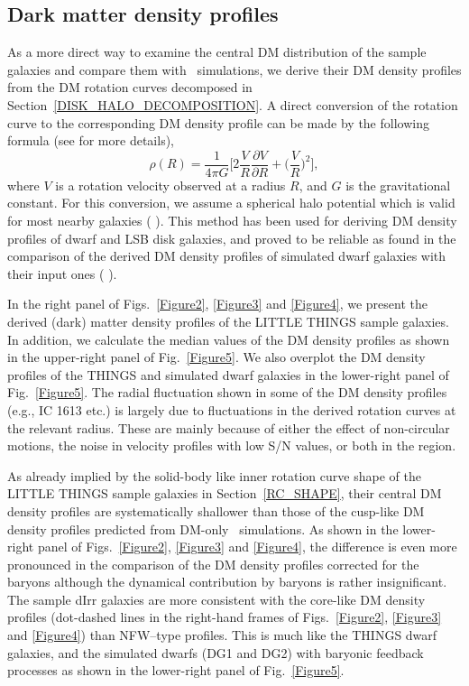 \documentclass[natbib209]{emulateapj}
\begin{document}
\subsection{Dark matter density profiles} \label{DM_PROFILE}
As a more direct way to examine the central DM distribution of the
sample galaxies and compare them with \LCDM\ simulations, we derive their DM
density profiles from the DM rotation curves decomposed in
Section~\ref{DISK_HALO_DECOMPOSITION}. A direct conversion of the rotation curve
to the corresponding DM density profile can be made by the following formula (see
\citeauthor{deBlok_2001} \citeyear{deBlok_2001} for more details),
\begin{equation}
\label{eq:10}
\rho(R) = \frac{1}{4\pi G}\Biggl[2\frac{V}{R}\frac{\partial V}{\partial R} +
\Biggl(\frac{V}{R}\Biggr)^{2}\Biggr],
\end{equation}
where $V$ is a rotation velocity observed at a radius $R$, and $G$ is the
gravitational constant. For this conversion, we assume a spherical halo
potential which is valid for most nearby galaxies
(\citeauthor{Trachternach_2008} \citeyear{Trachternach_2008}). This method has
been used for deriving DM density profiles of
dwarf and LSB disk galaxies, and proved to be reliable
as found in the comparison of the derived DM density profiles of
simulated dwarf galaxies with their input ones (\citeauthor{Oh_2011b}
\citeyear{Oh_2011b}).

In the right panel of Figs.~\ref{Figure2}, \ref{Figure3} and \ref{Figure4}, we present the derived (dark)
matter density profiles of the LITTLE THINGS sample galaxies. In addition, we
calculate the median values of the DM density profiles as shown in the
upper-right panel of Fig.~\ref{Figure5}. We also overplot the DM density profiles of
the THINGS and simulated dwarf galaxies in the lower-right panel of
Fig.~\ref{Figure5}. The radial fluctuation shown in some of the DM density
profiles (e.g., IC 1613 etc.) is largely due to fluctuations in the derived
rotation curves at the relevant radius. These are mainly because of either the
effect of non-circular motions, the noise in velocity profiles with low S/N
values, or both in the region. 

As already implied by the solid-body
like inner rotation curve shape of the LITTLE THINGS sample galaxies in
Section~\ref{RC_SHAPE}, their central DM density profiles are
systematically shallower than those of the cusp-like DM
density profiles predicted from DM-only \LCDM\ simulations. As
shown in the lower-right panel of Figs.~\ref{Figure2}, \ref{Figure3} and \ref{Figure4}, the difference is even more pronounced in the
comparison of the DM density profiles corrected for the baryons
although the dynamical contribution by baryons is rather insignificant. The sample dIrr 
galaxies are more consistent with the core-like DM density profiles (dot-dashed
lines in the right-hand frames of Figs.~\ref{Figure2}, \ref{Figure3} and \ref{Figure4}) than
NFW--type profiles. This is much like the THINGS dwarf galaxies, and the simulated dwarfs (DG1 and DG2) with baryonic
feedback processes as shown in the lower-right panel of Fig.~\ref{Figure5}. 
\end{document}
